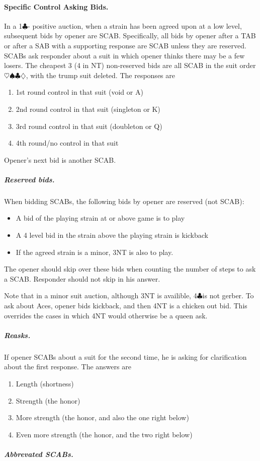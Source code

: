 \documentclass[10pt]{article}
\renewcommand{\c}{$\clubsuit$}
\renewcommand{\d}{$\diamondsuit$}
\newcommand{\h}{$\heartsuit$}
\newcommand{\s}{$\spadesuit$}
\begin{document}
\begin{multicols*}{2}
\paragraph{Specific Control Asking Bids.}
In a 1\c - positive auction, when a strain has been agreed upon at a low level,
subsequent bids by opener are SCAB. Specifically, all bids by opener after a TAB
or after a SAB with a supporting response are SCAB unless they are reserved.
SCABs ask responder about a suit in which opener thinks there may be a few
losers. The cheapest 3 (4 in NT) non-reserved bids are all SCAB in the suit
order \h\s\c\d, with the trump suit deleted. The responses are
\begin{enumerate}
\item 1st round control in that suit (void or A)
\item 2nd round control in that suit (singleton or K)
\item 3rd round control in that suit (doubleton or Q)
\item 4th round/no control in that suit
\end{enumerate}
Opener’s next bid is another SCAB.

\subparagraph{Reserved bids.}

When bidding SCABs, the following bids by opener are reserved (not SCAB):
\begin{itemize}
\item A bid of the playing strain at or above game is to play
\item A 4 level bid in the strain above the playing strain is kickback
\item If the agreed strain is a minor, 3NT is also to play.
\end{itemize}
The opener should skip over these bids when counting the number of steps to ask
a SCAB. Responder should not skip in his answer.

Note that in a minor suit auction, although 3NT is availible, 4\c is not gerber.
To ask about Aces, opener bids kickback, and then 4NT is a chicken out bid. This
overrides the cases in which 4NT would otherwise be a queen ask.
\subparagraph{Reasks.}

If opener SCABs about a suit for the second time, he is asking for clarification about the first response. The answers are
\begin{enumerate}
\item Length (shortness)
\item Strength (the honor)
\item More strength (the honor, and also the one right below)
\item Even more strength (the honor, and the two right below)
\end{enumerate}
\subparagraph{Abbrevated SCABs.}


\end{multicols*}
\end{document}
